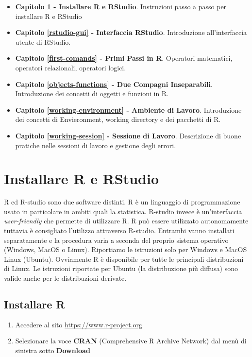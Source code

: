 \documentclass[
]{book}
\providecommand{\tightlist}{%
  \setlength{\itemsep}{0pt}\setlength{\parskip}{0pt}}
\begin{document}
\begin{itemize}
\tightlist
\item
  \textbf{Capitolo \ref{install} - Installare R e RStudio}. Instruzioni passo a passo per installare R e RStudio
\item
  \textbf{Capitolo \ref{rstudio-gui} - Interfaccia RStudio}. Introduzione all'interfaccia utente di RStudio.
\item
  \textbf{Capitolo \ref{first-comands} - Primi Passi in R}. Operatori matematici, operatori relazionali, operatori logici.
\item
  \textbf{Capitolo \ref{objects-functions} - Due Compagni Inseparabili}. Introduzione dei concetti di oggetti e funzioni in R.
\item
  \textbf{Capitolo \ref{working-environment} - Ambiente di Lavoro}. Introduzione dei concetti di Envieronment, working directory e dei pacchetti di R.
\item
  \textbf{Capitolo \ref{working-session} - Sessione di Lavoro}. Descrizione di buone pratiche nelle sessioni di lavoro e gestione degli errori.
\end{itemize}

\hypertarget{install}{%
\chapter{Installare R e RStudio}\label{install}}

R ed R-studio sono due software distinti. R è un linguaggio di programmazione usato in particolare in ambiti quali la statistica. R-studio invece è un'interfaccia \emph{user-friendly} che permette di utilizzare R.
R può essere utilizzato autonomamente tuttavia è consigliato l'utilizzo attraverso R-studio. Entrambi vanno installati separatamente e la procedura varia a seconda del proprio sistema operativo (Windows, MacOS o Linux). Riportiamo le istruzioni solo per Windows e MacOS Linux (Ubuntu). Ovviamente R è disponibile per tutte le principali distribuzioni di Linux. Le istruzioni riportate per Ubuntu (la distribuzione più diffusa) sono valide anche per le distribuzioni derivate.

\hypertarget{install-r}{%
\section{Installare R}\label{install-r}}

\begin{enumerate}
\def\labelenumi{\arabic{enumi}.}
\tightlist
\item
  Accedere al sito \url{https://www.r-project.org}
\item
  Selezionare la voce \textbf{CRAN} (Comprehensive R Archive Network) dal menù di sinistra sotto \textbf{Download}
\end{enumerate}
\end{document}
